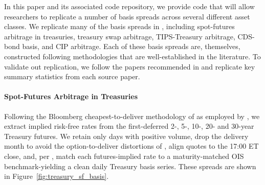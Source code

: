 \documentclass{article}
\begin{document}
In this paper and its associated code repository, we provide code that will allow researchers to replicate a number of basis spreads across several different asset classes. We replicate many of the basis spreads in \cite{Siriwardane2021}, including spot-futures arbitrage in treasuries, treasury swap arbitrage, TIPS-Treasury arbitrage, CDS-bond basis, and CIP arbitrage.
Each of these basis spreads are, themselves, constructed following methodologies that are well-established in the literature. To validate out replication, we follow the papers recommended in \cite{Siriwardane2021} and replicate key summary statistics from each source paper.




\paragraph{Spot-Futures Arbitrage in Treasuries}
Following the Bloomberg cheapest-to-deliver methodology of \citet{Fleckenstein2020} as employed by \citet{Siriwardane2021}, we extract implied risk-free rates from the first-deferred 2-, 5-, 10-, 20- and 30-year Treasury futures.  We retain only days with positive volume, drop the delivery month to avoid the option-to-deliver distortions of \citet{Burghardt2005}, align quotes to the 17:00 ET close, and, per \citet{Barth2021}, match each futures-implied rate to a maturity-matched OIS benchmark-yielding a clean daily Treasury basis series. These spreads are shown in Figure~\ref{fig:treasury_sf_basis}.
\end{document}
